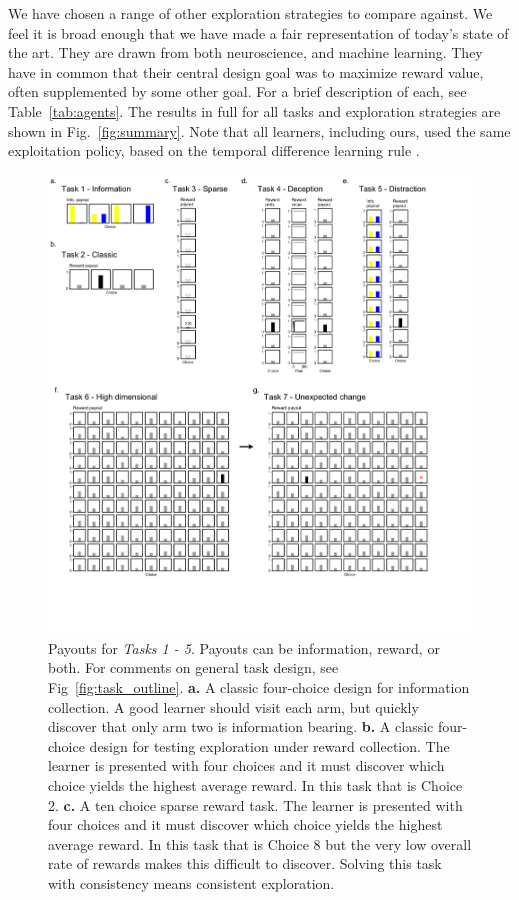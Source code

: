 We have chosen a range of other exploration strategies to compare against. We feel it is broad enough that we have made a fair representation of today's state of the art. They are drawn from both neuroscience, and machine learning. They have in common that their central design goal was to maximize reward value, often supplemented by some other goal. For a brief description of each, see Table~\ref{tab:agents}. The results in full for all tasks and exploration strategies are shown in Fig.~\ref{fig:summary}. Note that all learners, including ours, used the same exploitation policy, based on the temporal difference learning rule \cite{Sutton2018,needed}.

\begin{figure}
	\begin{fullwidth}
	\includegraphics[width=.8\linewidth]{img/task_payout.pdf} 
	\caption{Payouts for \textit{Tasks 1 - 5}. Payouts can be information, reward, or both. For comments on general task design, see Fig~\ref{fig:task_outline}.
	\textbf{a.} A classic four-choice design for information collection. A good learner should visit each arm, but quickly discover that only arm two is information bearing.
	\textbf{b.} A classic four-choice design for testing exploration under reward collection. The learner is presented with four choices and it must discover which choice yields the highest average reward. In this task that is Choice 2. 
	\textbf{c.} A ten choice sparse reward task. The learner is presented with four choices and it must discover which choice yields the highest average reward. In this task that is Choice 8 but the very low overall rate of rewards makes this difficult to discover. Solving this task with consistency means consistent exploration. 
}
\end{fullwidth}
\end{figure}
